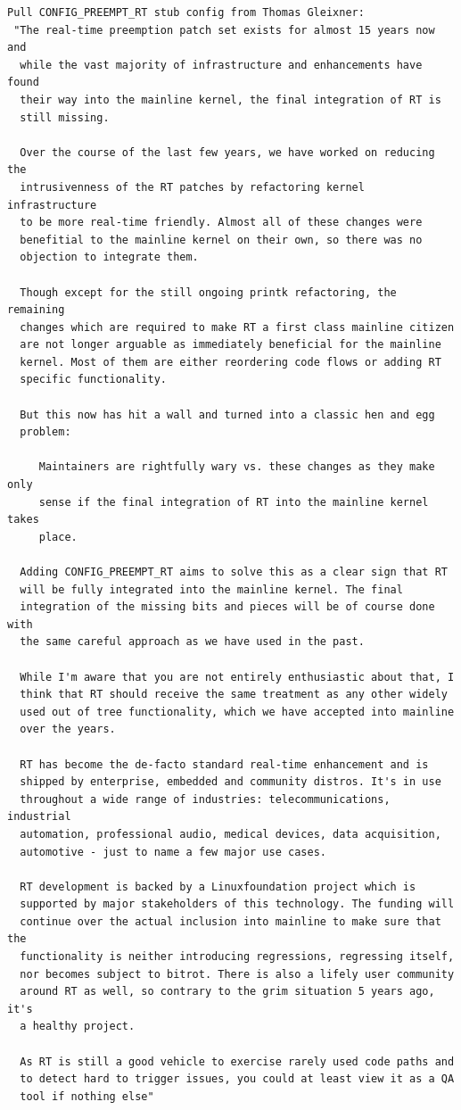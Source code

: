 \documentclass[12pt]{article}
\begin{document}
\begin{verbatim}
Pull CONFIG_PREEMPT_RT stub config from Thomas Gleixner:
 "The real-time preemption patch set exists for almost 15 years now and
  while the vast majority of infrastructure and enhancements have found
  their way into the mainline kernel, the final integration of RT is
  still missing.

  Over the course of the last few years, we have worked on reducing the
  intrusivenness of the RT patches by refactoring kernel infrastructure
  to be more real-time friendly. Almost all of these changes were
  benefitial to the mainline kernel on their own, so there was no
  objection to integrate them.

  Though except for the still ongoing printk refactoring, the remaining
  changes which are required to make RT a first class mainline citizen
  are not longer arguable as immediately beneficial for the mainline
  kernel. Most of them are either reordering code flows or adding RT
  specific functionality.

  But this now has hit a wall and turned into a classic hen and egg
  problem:

     Maintainers are rightfully wary vs. these changes as they make only
     sense if the final integration of RT into the mainline kernel takes
     place.

  Adding CONFIG_PREEMPT_RT aims to solve this as a clear sign that RT
  will be fully integrated into the mainline kernel. The final
  integration of the missing bits and pieces will be of course done with
  the same careful approach as we have used in the past.

  While I'm aware that you are not entirely enthusiastic about that, I
  think that RT should receive the same treatment as any other widely
  used out of tree functionality, which we have accepted into mainline
  over the years.

  RT has become the de-facto standard real-time enhancement and is
  shipped by enterprise, embedded and community distros. It's in use
  throughout a wide range of industries: telecommunications, industrial
  automation, professional audio, medical devices, data acquisition,
  automotive - just to name a few major use cases.

  RT development is backed by a Linuxfoundation project which is
  supported by major stakeholders of this technology. The funding will
  continue over the actual inclusion into mainline to make sure that the
  functionality is neither introducing regressions, regressing itself,
  nor becomes subject to bitrot. There is also a lifely user community
  around RT as well, so contrary to the grim situation 5 years ago, it's
  a healthy project.

  As RT is still a good vehicle to exercise rarely used code paths and
  to detect hard to trigger issues, you could at least view it as a QA
  tool if nothing else"
\end{verbatim}
\end{document}
